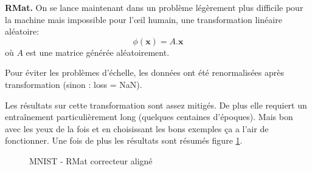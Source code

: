 {\Large\textbf{RMat.}} On se lance maintenant dans un problème légèrement plus
difficile pour la machine mais impossible pour l'œil humain, une transformation
linéaire aléatoire:
$$ \phi(\pmb{x}) = A.\pmb{x}$$
où $A$ est une matrice générée aléatoirement.

Pour éviter les problèmes d'échelle, les données ont été renormalisées après 
transformation (sinon : loss = NaN).

Les résultats sur cette transformation sont assez mitigés. De plus elle requiert
un entraînement particulièrement long (quelques centaines d'époques). Mais bon avec
les yeux de la fois et en choisissant les bons exemples ça a l'air de fonctionner.
Une fois de plus les résultats sont résumés figure \ref{fig:mnist_rmat_pairwise}.

\begin{figure}[H] %
\centering
{}
\hfill
{}
\caption{MNIST - RMat correcteur aligné}
\label{fig:mnist_rmat_pairwise}
\end{figure}


